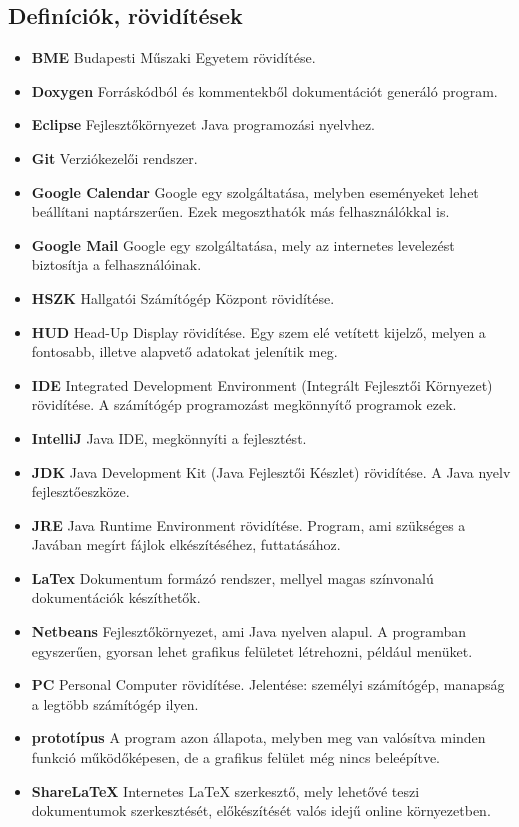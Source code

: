\subsection{Definíciók, rövidítések}
\begin{itemize}
\item \textbf{BME}	Budapesti Műszaki Egyetem rövidítése.
\item \textbf{Doxygen}	Forráskódból és kommentekből dokumentációt generáló program.
\item \textbf{Eclipse}	Fejlesztőkörnyezet Java programozási nyelvhez.
\item \textbf{Git}	Verziókezelői rendszer.
\item \textbf{Google Calendar}	Google egy szolgáltatása, melyben eseményeket lehet beállítani naptárszerűen. Ezek megoszthatók más felhasználókkal is.
\item \textbf{Google Mail}	Google egy szolgáltatása, mely az internetes levelezést biztosítja a felhasználóinak.
\item \textbf{HSZK}		Hallgatói Számítógép Központ rövidítése.
\item \textbf{HUD}	Head-Up Display rövidítése. Egy szem elé vetített kijelző, melyen a fontosabb, illetve alapvető adatokat jelenítik meg.
\item \textbf{IDE}	Integrated Development Environment (Integrált Fejlesztői Környezet) rövidítése. A számítógép programozást megkönnyítő programok ezek.
\item \textbf{IntelliJ}	Java IDE, megkönnyíti a fejlesztést.
\item \textbf{JDK}	Java Development Kit (Java Fejlesztői Készlet) rövidítése. A Java nyelv fejlesztőeszköze.
\item \textbf{JRE}	Java Runtime Environment rövidítése. Program, ami szükséges a Javában megírt fájlok elkészítéséhez, futtatásához.
\item \textbf{LaTex}		Dokumentum formázó rendszer, mellyel magas színvonalú dokumentációk készíthetők.
\item \textbf{Netbeans}	Fejlesztőkörnyezet, ami Java nyelven alapul. A programban egyszerűen, gyorsan lehet grafikus felületet létrehozni, például menüket.
\item \textbf{PC}	Personal Computer rövidítése. Jelentése: személyi számítógép, manapság a legtöbb számítógép ilyen.
\item \textbf{prototípus}	A program azon állapota, melyben meg van valósítva minden funkció működőképesen, de a grafikus felület még nincs beleépítve.
\item \textbf{ShareLaTeX}	Internetes LaTeX szerkesztő, mely lehetővé teszi dokumentumok szerkesztését, előkészítését valós idejű online környezetben.

\end{itemize}
